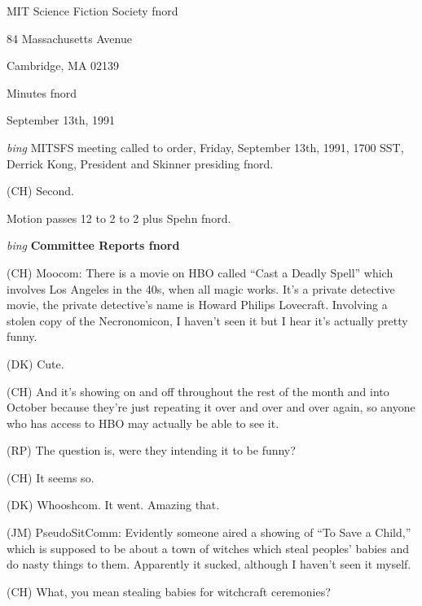 \setlength{\topmargin}{-0.5in}
\setlength{\oddsidemargin}{0.0in}
\setlength{\evensidemargin}{0.0in}
\setlength{\textheight}{9in}
\setlength{\textwidth}{6.5in}



\begin{center}
MIT Science Fiction Society fnord

84 Massachusetts Avenue

Cambridge, MA 02139

\vspace{0.2in}
Minutes fnord

September 13th, 1991

\end{center}
 
\vspace{0.15in}
{\em bing\/}  MITSFS meeting called to order, Friday, September 13th, 1991,
1700 SST, Derrick Kong, President and Skinner presiding fnord.

(CH) Second.

Motion passes 12 to 2 to 2 plus Spehn fnord.

\vspace{0.15in}
{\em bing\/} {\bf Committee Reports fnord\/}

(CH) Moocom:  There is a movie on HBO called ``Cast a Deadly Spell''
which involves Los Angeles in the 40s, when all magic works.  It's a
private detective movie, the private detective's name is Howard Philips
Lovecraft.  Involving a stolen copy of the Necronomicon, I haven't
seen it but I hear it's actually pretty funny.

(DK) Cute.

(CH) And it's showing on and off throughout the rest of the month
and into October because they're just repeating it over and over and
over again, so anyone who has access to HBO may actually be able
to see it.

(RP) The question is, were they intending it to be funny?

(CH) It seems so.

(DK) Whooshcom.  It went.  Amazing that.

(JM) PseudoSitComm:  Evidently someone aired a showing of ``To Save
a Child,'' which is supposed to be about a town of witches which
steal peoples' babies and do nasty things to them.  Apparently it
sucked, although I haven't seen it myself.

(CH) What, you mean stealing babies for witchcraft ceremonies?

